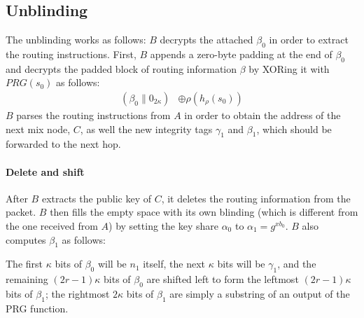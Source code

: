 \subsection{Unblinding}
The unblinding works as follows: $B$ decrypts the attached $\beta_0$ in order to extract the routing instructions. First, $B$ appends a zero-byte padding at the end of $\beta_0$ and decrypts the padded block of routing information $\beta$ by XORing it with $PRG(s_{0})$ as follows:
\begin{align}
    (\beta_0\|0_{2\kappa})&\oplus \rho(h_{\rho}(s_{0}))
\end{align}
$B$ parses the routing instructions from $A$ in order to obtain the address of the next mix node, $C$, as well the new integrity tags $\gamma_1$ and $\beta_1$, which should be forwarded to the next hop.
\paragraph{Delete and shift}
After $B$ extracts the public key of $C$, it deletes the routing information from the packet. $B$ then fills the empty space with its own blinding (which is different from the one received from $A$) by setting the key share $\alpha_0$ to $\alpha_1=g^{xb_0}$. $B$ also computes $\beta_1$ as follows:

The first $\kappa$ bits of $\beta_0$ will be $n_{1}$ itself, the next $\kappa$ bits will be $\gamma_{1}$, and the remaining $(2r-1)\kappa$ bits of $\beta_0$ are shifted left to form the leftmost $(2r-1)\kappa$ bits of $\beta_{1}$; the rightmost $2\kappa$ bits of $\beta_{1}$ are simply a substring of an output of the PRG function.

